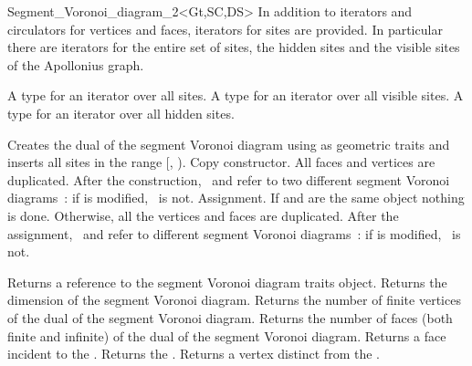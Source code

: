 \begin{ccRefClass}{Segment_Voronoi_diagram_2<Gt,SC,DS>}
In addition to iterators and circulators for vertices and faces,
iterators for sites are provided. In particular there are iterators
for the entire set of sites, the hidden sites and the visible sites of
the Apollonius graph.


{}
{A type for an iterator over all sites.}
\ccGlue
{}
{A type for an iterator over all visible sites.}
\ccGlue
{}
{A type for an iterator over all hidden sites.}


\ccCreation
{}
\ccThreeToTwo
%
%
{Creates the dual of the segment Voronoi diagram using  as
geometric traits and inserts all sites in the range
[, ).
}
%
{Copy constructor. All faces and vertices are duplicated. After the
  construction, 
  \ccVar\ and  refer to two different segment Voronoi diagrams~: if
   is modified, \ccVar\ is not.}
%
{Assignment. If  and  are the same object
  nothing is done. Otherwise, all the vertices and faces are
  duplicated. After the assignment, \ccVar\ and  refer to
  different segment Voronoi diagrams~: if  is modified,
  \ccVar\ is not.}




\ccAccessFunctions
%
{Returns a reference to the segment Voronoi diagram traits object.}
\ccGlue
{}
{Returns the dimension of the segment Voronoi diagram.}
\ccGlue
{}
{Returns the number of finite vertices of the dual of the segment
  Voronoi diagram.}
\ccGlue
{}
{Returns the number of faces (both finite and infinite) of the
  dual of the segment Voronoi diagram.}
\ccGlue
{}
{Returns a face incident to the .}
\ccGlue
{}
{Returns the .}
\ccGlue
{}
{Returns a vertex distinct from  the .
}
\ccGlue
{}
\ccGlue
{}



\end{ccRefClass}
